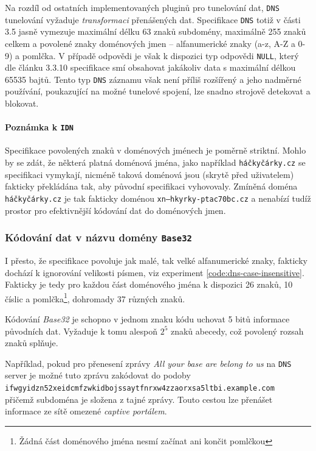 \documentclass[thesis=M,czech]{FITthesis}[2012/10/20]
\begin{document}
    Na rozdíl od ostatních implementovaných pluginů pro tunelování dat, \texttt{DNS} tunelování vyžaduje \textit{transformaci} přenášených dat. Specifikace \texttt{DNS} \cite[RFC 1035]{rfc1035} totiž v části 3.5 jasně vymezuje maximální délku 63 znaků subdomény, maximálně 255 znaků celkem a povolené znaky doménových jmen -- alfanumerické znaky (a-z, A-Z a 0-9) a pomlčka. V případě odpovědi je však k dispozici typ odpovědi \texttt{NULL}, který dle článku 3.3.10 specifikace \cite[RFC 1035]{rfc1035} smí obsahovat jakákoliv data s maximální délkou 65535 bajtů. Tento typ \texttt{DNS} záznamu však není příliš rozšířený a jeho nadměrné používání, poukazující na možné tunelové spojení, lze snadno strojově detekovat a blokovat.
    
    \paragraph{Poznámka k \texttt{IDN}} Specifikace povolených znaků v doménových jménech je poměrně striktní. Mohlo by se zdát, že některá platná doménová jména, jako například \texttt{háčkyčárky.cz} se specifikaci vymykají, nicméně taková doménová jsou (skrytě před uživatelem) fakticky překládána tak, aby původní specifikaci vyhovovaly. Zmíněná doména \texttt{háčkyčárky.cz} je tak fakticky doménou \texttt{xn--hkyrky-ptac70bc.cz} a nenabízí tudíž prostor pro efektivnější kódování dat do doménových jmen.
    
    \subsubsection{Kódování dat v názvu domény \texttt{Base32}}
    
    I přesto, že specifikace povoluje jak malé, tak velké alfanumerické znaky, fakticky dochází k ignorování velikosti písmen, viz experiment \ref{code:dns-case-insensitive}. Fakticky je tedy pro každou část doménového jména k dispozici 26 znaků, 10 číslic a pomlčka\footnote{Žádná část doménového jména nesmí začínat ani končit pomlčkou}, dohromady 37 různých znaků.
    
    Kódování \textit{Base32} je schopno v jednom znaku kódu uchovat 5 bitů informace původních dat. Vyžaduje k tomu alespoň $2^5$ znaků abecedy, což povolený rozsah znaků splňuje.
    
    Například, pokud pro přenesení zprávy \textit{All your base are belong to us} na \texttt{DNS} server je možné tuto zprávu zakódovat do podoby\\ 
        \texttt{ifwgyidzn52xeidcmfzwkidbojssaytfnrxw4zzaorxsa5ltbi.example.com} \\
    přičemž subdoména je složena z tajné zprávy. Touto cestou lze přenášet informace ze sítě omezené \textit{captive portálem}.
    
\end{document}
